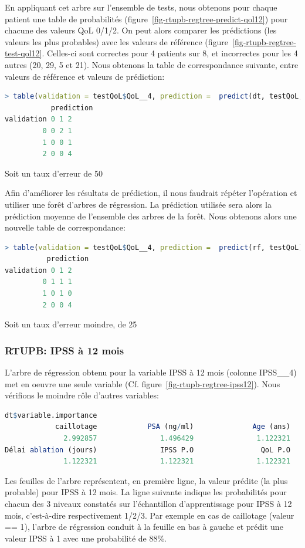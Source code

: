 En appliquant cet arbre sur l'ensemble de tests, nous obtenons pour chaque patient une table de probabilités (figure~\ref{fig-rtupb-regtree-predict-qol12}) pour chacune des valeurs QoL 0/1/2. On peut alors comparer les prédictions (les valeurs les plus probables) avec les valeurs de référence (figure~\ref{fig-rtupb-regtree-test-qol12}. Celles-ci sont correctes pour 4 patients sur 8, et incorrectes pour les 4 autres (20, 29, 5 et 21). Nous obtenons la table de correspondance suivante, entre valeurs de référence et valeurs de prédiction:

\begin{lstlisting}[language=R]
> table(validation = testQoL$QoL__4, prediction =  predict(dt, testQoL, type="class"))
           prediction
validation 0 1 2
         0 0 2 1
         1 0 0 1
         2 0 0 4
\end{lstlisting}
Soit un taux d'erreur de 50%

Afin d'améliorer les résultats de prédiction, il nous faudrait répéter l'opération et utiliser une forêt d'arbres de régression. La prédiction utilisée sera alors la prédiction moyenne de l'ensemble des arbres de la forêt. Nous obtenons alors une nouvelle table de correspondance:

\begin{lstlisting}[language=R]
> table(validation = testQoL$QoL__4, prediction =  predict(rf, testQoL))
          prediction
validation 0 1 2
         0 1 1 1
         1 0 1 0
         2 0 0 4
\end{lstlisting}
Soit un taux d'erreur moindre, de 25%

\subsubsection{RTUPB: IPSS à 12 mois}

L'arbre de régression obtenu pour la variable IPSS à 12 mois (colonne IPSS\_\_4) met en oeuvre une seule variable (Cf. figure~\ref{fig-rtupb-regtree-ipss12}).
Nous vérifions le moindre rôle d'autres variables:
\begin{lstlisting}[language=R]
dt$variable.importance
            caillotage            PSA (ng/ml)              Age (ans) 
              2.992857               1.496429               1.122321 
Délai ablation (jours)               IPSS P.O                QoL P.O 
              1.122321               1.122321               1.122321 
\end{lstlisting}
Les feuilles de l'arbre représentent, en première ligne, la valeur prédite (la plus probable) pour IPSS à 12 mois. La ligne suivante indique les probabilités pour chacun des 3 niveaux constatés sur l'échantillon d'apprentissage pour IPSS à 12 mois, c'est-à-dire respectivement 1/2/3. Par exemple en cas de caillotage (valeur == 1), l'arbre de régression conduit à la feuille en bas à gauche et prédit une valeur IPSS à 1 avec une probabilité de 88\%.


